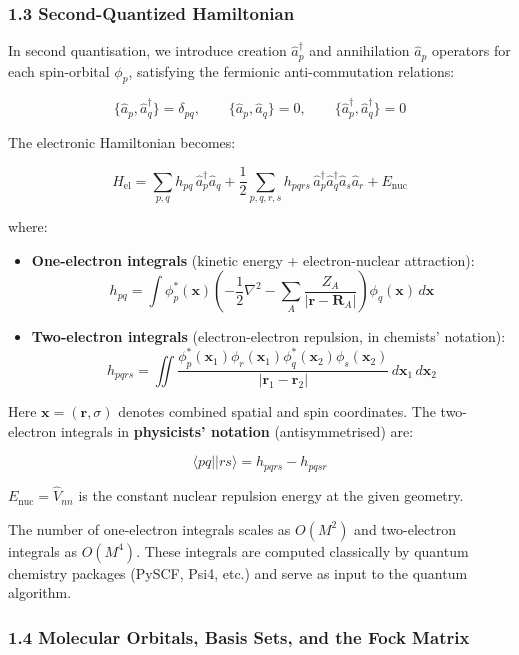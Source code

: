 \documentclass[
  11pt,
]{report}
\begin{document}
\subsubsection{1.3 Second-Quantized
Hamiltonian}\label{second-quantized-hamiltonian}

In second quantisation, we introduce creation \(\hat{a}_p^\dagger\) and
annihilation \(\hat{a}_p\) operators for each spin-orbital \(\phi_p\),
satisfying the fermionic anti-commutation relations:

\[\{\hat{a}_p, \hat{a}_q^\dagger\} = \delta_{pq}, \qquad \{\hat{a}_p, \hat{a}_q\} = 0, \qquad \{\hat{a}_p^\dagger, \hat{a}_q^\dagger\} = 0\]

The electronic Hamiltonian becomes:

\[\hat{H}_{\text{el}} = \sum_{p,q} h_{pq}\, \hat{a}_p^\dagger \hat{a}_q + \frac{1}{2}\sum_{p,q,r,s} h_{pqrs}\, \hat{a}_p^\dagger \hat{a}_q^\dagger \hat{a}_s \hat{a}_r + E_{\text{nuc}}\]

where:

\begin{itemize}
\item
  \textbf{One-electron integrals} (kinetic energy + electron-nuclear
  attraction):
  \[h_{pq} = \int \phi_p^*(\mathbf{x})\left(-\frac{1}{2}\nabla^2 - \sum_A \frac{Z_A}{|\mathbf{r} - \mathbf{R}_A|}\right)\phi_q(\mathbf{x})\,d\mathbf{x}\]
\item
  \textbf{Two-electron integrals} (electron-electron repulsion, in
  chemists' notation):
  \[h_{pqrs} = \iint \frac{\phi_p^*(\mathbf{x}_1)\phi_r(\mathbf{x}_1)\phi_q^*(\mathbf{x}_2)\phi_s(\mathbf{x}_2)}{|\mathbf{r}_1 - \mathbf{r}_2|}\,d\mathbf{x}_1\,d\mathbf{x}_2\]
\end{itemize}

Here \(\mathbf{x} = (\mathbf{r}, \sigma)\) denotes combined spatial and
spin coordinates. The two-electron integrals in \textbf{physicists'
notation} (antisymmetrised) are:

\[\langle pq || rs \rangle = h_{pqrs} - h_{pqsr}\]

\(E_{\text{nuc}} = \hat{V}_{nn}\) is the constant nuclear repulsion
energy at the given geometry.

The number of one-electron integrals scales as \(O(M^2)\) and
two-electron integrals as \(O(M^4)\). These integrals are computed
classically by quantum chemistry packages (PySCF, Psi4, etc.) and serve
as input to the quantum algorithm.

\subsubsection{1.4 Molecular Orbitals, Basis Sets, and the Fock
Matrix}\label{molecular-orbitals-basis-sets-and-the-fock-matrix}
\end{document}
